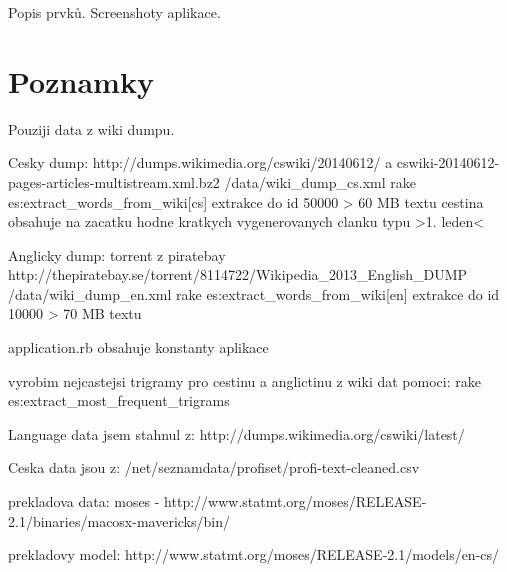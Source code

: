 Popis prvků. Screenshoty aplikace.

\section{Poznamky}

Pouziji data z wiki dumpu.

Cesky dump:
http://dumps.wikimedia.org/cswiki/20140612/ a cswiki-20140612-pages-articles-multistream.xml.bz2
/data/wiki_dump_cs.xml
rake es:extract_words_from_wiki[cs]
extrakce do id 50000 > 60 MB textu
cestina obsahuje na zacatku hodne kratkych vygenerovanych clanku typu >1. leden<

Anglicky dump:
torrent z piratebay http://thepiratebay.se/torrent/8114722/Wikipedia_2013_English_DUMP
/data/wiki_dump_en.xml
rake es:extract_words_from_wiki[en]
extrakce do id 10000 > 70 MB textu

application.rb obsahuje konstanty aplikace

vyrobim nejcastejsi trigramy pro cestinu a anglictinu z wiki dat pomoci:
rake es:extract_most_frequent_trigrams

Language data jsem stahnul z:
http://dumps.wikimedia.org/cswiki/latest/

Ceska data jsou z:
/net/seznamdata/profiset/profi-text-cleaned.csv

prekladova data:
moses - http://www.statmt.org/moses/RELEASE-2.1/binaries/macosx-mavericks/bin/

prekladovy model:
http://www.statmt.org/moses/RELEASE-2.1/models/en-cs/

